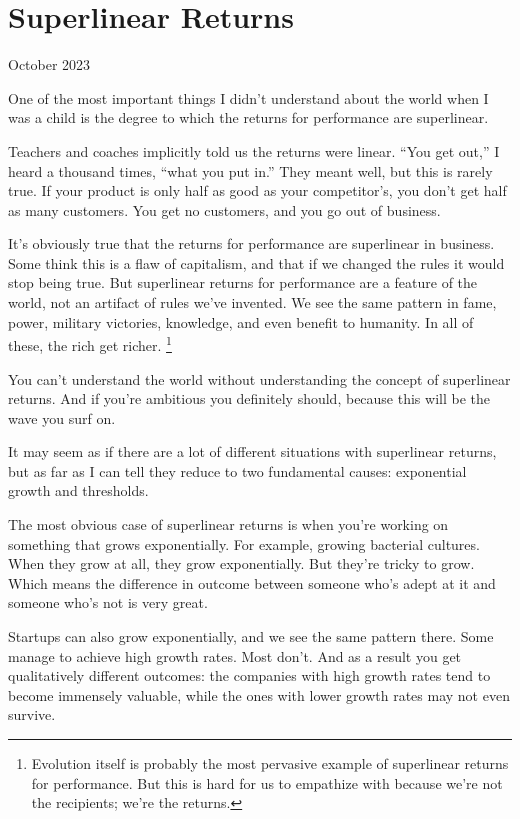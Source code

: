 \chapter{Superlinear Returns}

October 2023

One of the most important things I didn't understand about the world
when I was a child is the degree to which the returns for performance
are superlinear.

Teachers and coaches implicitly told us the returns were linear. ``You
get out,'' I heard a thousand times, ``what you put in.'' They meant
well, but this is rarely true. If your product is only half as good as
your competitor's, you don't get half as many customers. You get no
customers, and you go out of business.

It's obviously true that the returns for performance are superlinear in
business. Some think this is a flaw of capitalism, and that if we
changed the rules it would stop being true. But superlinear returns for
performance are a feature of the world, not an artifact of rules we've
invented. We see the same pattern in fame, power, military victories,
knowledge, and even benefit to humanity. In all of these, the rich get
richer. \footnote{Evolution itself is probably the most pervasive example of
superlinear returns for performance. But this is hard for us to
empathize with because we're not the recipients; we're the returns.}

You can't understand the world without understanding the concept of
superlinear returns. And if you're ambitious you definitely should,
because this will be the wave you surf on.

It may seem as if there are a lot of different situations with
superlinear returns, but as far as I can tell they reduce to two
fundamental causes: exponential growth and thresholds.

The most obvious case of superlinear returns is when you're working on
something that grows exponentially. For example, growing bacterial
cultures. When they grow at all, they grow exponentially. But they're
tricky to grow. Which means the difference in outcome between someone
who's adept at it and someone who's not is very great.

Startups can also grow exponentially, and we see the same pattern there.
Some manage to achieve high growth rates. Most don't. And as a result
you get qualitatively different outcomes: the companies with high growth
rates tend to become immensely valuable, while the ones with lower
growth rates may not even survive.

